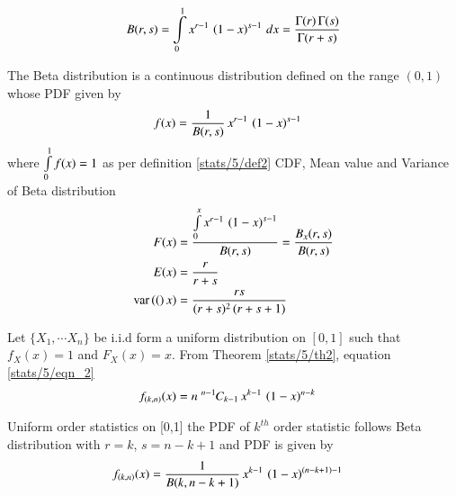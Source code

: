 %
\begin{definition}
    \label{stats/5/def2}
    \begin{equation}
    B(r,s) = \int\limits_{0}^{1} x^{r-1}\,\left(1-x\right)^{s-1}\,dx = \dfrac{\Gamma(r)\,\Gamma(s)}{\Gamma(r+s)} 
    \label{stats/5/eqn_5}
    \end{equation}
    \end{definition}
    \begin{definition}
    \label{stats/5/bddef}
    The Beta distribution is a continuous distribution defined on the range $(0,1)$ whose PDF given by 
    \begin{align}
    f(x) &= \dfrac{1}{B(r,s)}\,x^{r-1}\,\left(1-x\right)^{s-1} 
    \end{align}
    where $\int\limits_{0}^1f(x) = 1$ as per definition \eqref{stats/5/def2} 
    CDF, Mean value and Variance of Beta distribution
    \begin{align}
     F(x)   &=\dfrac{\int\limits_{0}^{x}x^{r-1}\,\left(1-x\right)^{s-1}}{B(r,s)} =    \dfrac{B_{x}(r,s)}{B(r,s)} \\
     E(x)   &=   \dfrac{r}{r+s} \\
     \text{var}\left( ( \right)x) &= \dfrac{rs}{(r+s)^{2}\,(r+s+1)}
    \end{align}
    \end{definition}
    \begin{definition}
    Let $\{X_1,\cdots X_n\}$ be i.i.d form a uniform distribution on $[0,1]$ such that $f_{X}(x) = 1$ and $F_{X}(x)=x$.
    From Theorem \eqref{stats/5/th2}, equation \eqref{stats/5/eqn_2}
    \begin{align}
    f_{(k,n)}(x) &= n\;{{}^{n-1}\mkern-1muC_{k-1}}\,x^{k-1}\,\left(1-x\right)^{n-k}\label{stats/5/eqn_3}
    \end{align}
    \end{definition}
    \begin{lemma}
    \label{stats/5/lma}
    Uniform order statistics on [0,1] the PDF of $k^{th}$ order statistic follows Beta distribution with $r=k$, $s=n-k+1$
    and  PDF is given by 
    \begin{align}
    f_{(k,n)}(x) &= \dfrac{1}{B(k,n-k+1)}\,x^{k-1}\,\left(1-x\right)^{(n-k+1)-1} 
    \end{align}
    \end{lemma}
    \newpage
